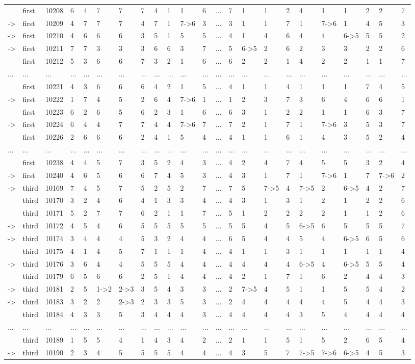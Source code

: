 \begin{landscape}
{\begin{longtable}{lllllllllllllllllllllll}
&first&10208&6&4&7&7&7&4&1&1&6&...&7&1&1&2&4&1&1&2&2&7\tabularnewline
-\textgreater &first&10209&4&7&7&7&4&7&1&7-\textgreater 6&3&...&3&1&1&7&1&7-\textgreater 6&1&4&5&3\tabularnewline
-\textgreater &first&10210&4&6&6&6&3&5&1&5&5&...&4&1&4&6&4&4&6-\textgreater 5&5&5&2\tabularnewline
-\textgreater &first&10211&7&7&3&3&3&6&6&3&7&...&5&6-\textgreater 5&2&6&2&3&3&2&2&6\tabularnewline
&first&10212&5&3&6&6&7&3&2&1&6&...&6&2&2&1&4&2&2&1&1&7\tabularnewline
\newpage
...&...&...&...&...&...&...&...&...&...&...&...&...&...&...&...&...&...&...&...&...&...&...\tabularnewline
&first&10221&4&3&6&6&6&4&2&1&5&...&4&1&1&4&1&1&1&7&4&5\tabularnewline
-\textgreater &first&10222&1&7&4&5&2&6&4&7-\textgreater 6&1&...&1&2&3&7&3&6&4&6&6&1\tabularnewline
&first&10223&6&2&6&5&6&2&3&1&6&...&6&3&1&2&2&1&1&6&3&7\tabularnewline
-\textgreater &first&10224&6&4&4&7&7&4&4&7-\textgreater 6&7&...&7&2&1&7&1&7-\textgreater 6&3&5&3&7\tabularnewline
&first&10226&2&6&6&6&2&4&1&5&4&...&4&1&1&6&1&4&3&5&2&4\tabularnewline
...&...&...&...&...&...&...&...&...&...&...&...&...&...&...&...&...&...&...&...&...&...&...\tabularnewline
&first&10238&4&4&5&7&3&5&2&4&3&...&4&2&4&7&4&5&5&3&2&4\tabularnewline
-\textgreater &first&10240&4&6&5&6&6&7&4&5&3&...&4&3&1&7&1&7-\textgreater 6&1&7&7-\textgreater 6&2\tabularnewline
-\textgreater &third&10169&7&4&5&7&5&2&5&2&7&...&7&5&7-\textgreater 5&4&7-\textgreater 5&2&6-\textgreater 5&4&2&7\tabularnewline
&third&10170&3&2&4&6&4&1&3&3&4&...&4&3&1&3&1&2&1&2&2&6\tabularnewline
&third&10171&5&2&7&7&6&2&1&1&7&...&5&1&2&2&2&2&1&1&2&6\tabularnewline
-\textgreater &third&10172&4&5&4&6&5&5&5&5&5&...&5&5&4&5&6-\textgreater 5&6&5&5&5&7\tabularnewline
-\textgreater &third&10174&3&4&4&4&5&3&2&4&4&...&6&5&4&4&5&4&6-\textgreater 5&6&5&6\tabularnewline
&third&10175&4&1&4&5&7&1&1&1&4&...&4&1&1&3&1&1&1&1&1&4\tabularnewline
-\textgreater &third&10176&3&6&4&4&5&5&5&4&4&...&4&4&4&4&6-\textgreater 5&4&6-\textgreater 5&5&5&4\tabularnewline
&third&10179&6&5&6&6&2&5&1&4&4&...&4&2&1&7&1&6&2&4&4&3\tabularnewline
-\textgreater &third&10181&2&5&1-\textgreater 2&2-\textgreater 3&3&5&4&3&3&...&2&7-\textgreater 5&4&5&1&1&5&5&4&2\tabularnewline
-\textgreater &third&10183&3&2&2&2-\textgreater 3&2&3&3&5&3&...&2&4&4&4&4&4&5&4&4&3\tabularnewline
&third&10184&4&3&3&5&3&4&4&4&3&...&4&4&4&4&3&5&4&4&4&4\tabularnewline
...&...&...&...&...&...&...&...&...&...&...&...&...&...&...&...&...&...&...&...&...&...&...\tabularnewline
&third&10189&1&5&5&4&1&4&3&4&2&...&2&1&1&5&1&5&2&6&5&4\tabularnewline
-\textgreater &third&10190&2&3&4&5&5&5&5&4&4&...&4&3&5&7&7-\textgreater 5&7-\textgreater 6&6-\textgreater 5&4&5&3\tabularnewline

\end{longtable}}
\end{landscape}
